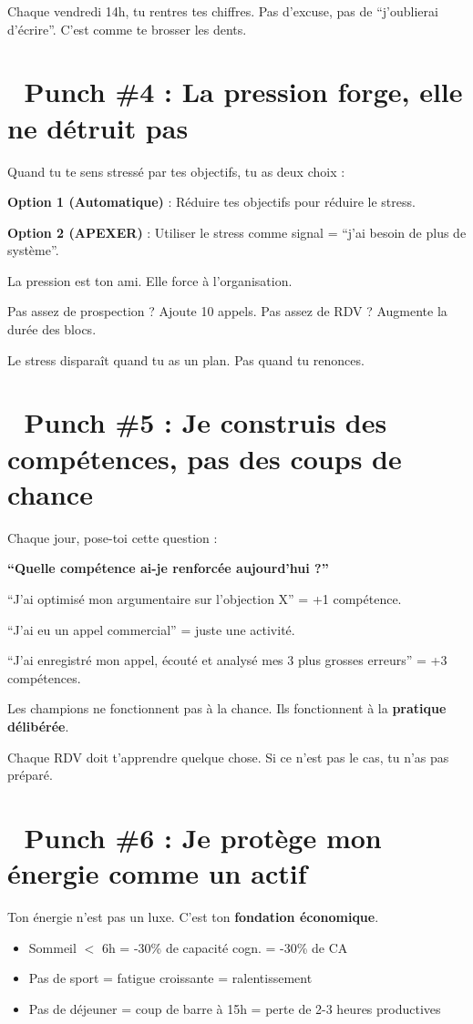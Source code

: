 \documentclass[12pt,a4paper,openany]{book}
\begin{document}
Chaque vendredi 14h, tu rentres tes chiffres. Pas d'excuse, pas de ``j'oublierai d'écrire''. C'est comme te brosser les dents.

\section*{🥊 Punch \#4 : La pression forge, elle ne détruit pas}

Quand tu te sens stressé par tes objectifs, tu as deux choix :

\textbf{Option 1 (Automatique)} : Réduire tes objectifs pour réduire le stress.

\textbf{Option 2 (APEXER)} : Utiliser le stress comme signal = ``j'ai besoin de plus de système''.

La pression est ton ami. Elle force à l'organisation.

Pas assez de prospection ? Ajoute 10 appels. Pas assez de RDV ? Augmente la durée des blocs.

Le stress disparaît quand tu as un plan. Pas quand tu renonces.

\section*{🥊 Punch \#5 : Je construis des compétences, pas des coups de chance}

Chaque jour, pose-toi cette question :

\textbf{``Quelle compétence ai-je renforcée aujourd'hui ?''}

``J'ai optimisé mon argumentaire sur l'objection X'' = +1 compétence.

``J'ai eu un appel commercial'' = juste une activité.

``J'ai enregistré mon appel, écouté et analysé mes 3 plus grosses erreurs'' = +3 compétences.

Les champions ne fonctionnent pas à la chance. Ils fonctionnent à la \textbf{pratique délibérée}.

Chaque RDV doit t'apprendre quelque chose. Si ce n'est pas le cas, tu n'as pas préparé.

\section*{🥊 Punch \#6 : Je protège mon énergie comme un actif}

Ton énergie n'est pas un luxe. C'est ton \textbf{fondation économique}.

\begin{itemize}
\item Sommeil $<$ 6h = -30\% de capacité cogn. = -30\% de CA
\item Pas de sport = fatigue croissante = ralentissement
\item Pas de déjeuner = coup de barre à 15h = perte de 2-3 heures productives
\end{itemize}
\end{document}
